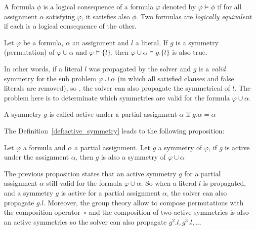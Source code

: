 \begin{definition}
	\label{def:logical_consequence}
	A formula $\phi$ is a logical consequence of a formula $\varphi$ denoted by $\varphi \models \phi$ if for all assignment
	$\alpha$ satisfying $\varphi$, it satisfies also $\phi$. Two formulas are \emph{logically equivalent} if each is a logical
	consequence of the other.
\end{definition}

\begin{proposition}
	\label{prop:symmetry_propagation}
	Let $\varphi$ be a formula, $\alpha$ an assignment and $l$ a literal. 
	If $g$ is a symmetry (permutation) of $\varphi \cup \alpha$ and
	$\varphi \models \{l\}$, then $\varphi \cup \alpha \models g.\{l\}$ is also true.
\end{proposition}

In other words, if a literal $l$ was propagated by the solver and $g$ is a \emph{valid} symmetry for the
sub problem $\varphi \cup \alpha$ (in which all satisfied clauses and false literals are removed), so , the solver can
also propagate the symmetrical of $l$. The problem here is to determinate which symmetries are valid for the formula
$\varphi \cup \alpha$.

\begin{definition}
	\label{def:active_symmetry}
	A symmetry $g$ is called active under a partial assignment $\alpha$ $\text{if } g.\alpha = \alpha$
\end{definition}

The Definition~\ref{def:active_symmetry} leads to the following proposition:

\begin{proposition}
	\label{prop:active_symmetry}
	Let $\varphi$ a formula and $\alpha$ a partial assignment. Let $g$ a symmetry of $\varphi$,
	if $g$ is active under the assignment $\alpha$, then $g$ is also a symmetry of $\varphi \cup \alpha$
\end{proposition}

The previous proposition states that an active symmetry $g$ for a partial assignment $\alpha$ still valid for
the formula $\varphi \cup \alpha$. So when a literal $l$ is propagated, and a symmetry $g$ is active for a
partial assignment $\alpha$, the solver can also propagate $g.l$. 
Moreover, the group theory allow to compose permutations with the composition operator~$\circ$ and the composition of two active symmetries is also an active symmetries so the solver can also propagate $g^2.l, g^3.l, ... $

